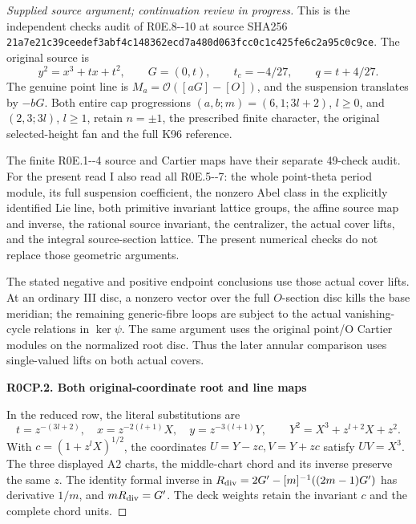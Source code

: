 \begin{proof}[Supplied source argument; continuation review in progress]
\par\nobreak

This is the independent checks audit of R0E.8-\/-10 at source SHA256
\texttt{21a7e21c\allowbreak 39ceedef\allowbreak 3abf4c14\allowbreak 8362ecd7\allowbreak a480d063\allowbreak fcc0c1c4\allowbreak 25fe6c2a\allowbreak 95c0c9ce}.
The original source is
\[
 y^2=x^3+tx+t^2,\qquad G=(0,t),\qquad
 t_c=-4/27,\qquad q=t+4/27.
\]
The genuine point line is \(M_a=\mathcal O([aG]-[O])\), and the
suspension translates by \(-bG\). Both entire cap progressions
\((a,b;m)=(6,1;3l+2)\), \(l\geq0\), and
\((2,3;3l)\), \(l\geq1\), retain \(n=\pm1\), the prescribed finite
character, the original selected-height fan and the full K96 reference.

The finite R0E.1-\/-4 source and Cartier maps have their separate
49-check audit. For the present read I also read all R0E.5-\/-7:
the whole point-theta period module, its full suspension coefficient,
the nonzero Abel class in the explicitly identified Lie line, both
primitive invariant lattice groups, the affine source map and inverse,
the rational source invariant, the centralizer, the actual cover lifts,
and the integral source-section lattice. The present numerical checks
do not replace those geometric arguments.

The stated negative and positive endpoint conclusions use those actual
cover lifts. At an ordinary III disc, a nonzero vector over the full
\(O\)-section disc kills the base meridian; the remaining generic-fibre
loops are subject to the actual vanishing-cycle relations in
\(\ker\psi\). The same argument uses the original point/O Cartier
modules on the normalized root disc. Thus the later annular comparison
uses single-valued lifts on both actual covers.

\par

\medskip\noindent\textbf{R0CP.2. Both original-coordinate root and line maps}

\par\nobreak

In the reduced row, the literal substitutions are
\[
 t=z^{-(3l+2)},\quad x=z^{-2(l+1)}X,\quad y=z^{-3(l+1)}Y,
 \qquad Y^2=X^3+z^{l+2}X+z^2.
\]
With \(c=(1+z^lX)^{1/2}\), the coordinates
\(U=Y-zc,V=Y+zc\) satisfy \(UV=X^3\). The three displayed A2
charts, the middle-chart chord and its inverse preserve the same
\(z\). The identity formal inverse in
\(R_{\rm div}=2G'-[m]^{-1}((2m-1)G')\) has derivative \(1/m\),
and \(mR_{\rm div}=G'\). The deck weights retain the invariant
\(c\) and the complete chord units.


\end{proof}
